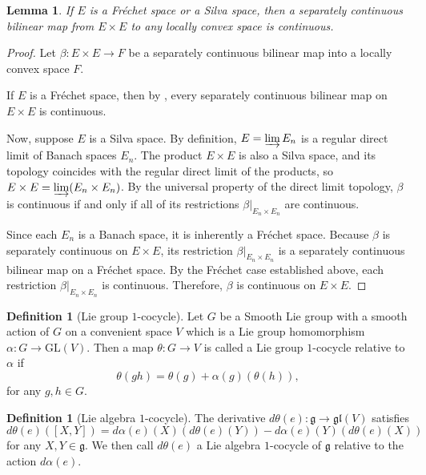 \documentclass[11pt,reqno]{amsart}
\newtheorem{lemma}[theorem]{Lemma}
\theoremstyle{definition}
\newtheorem{definition}[theorem]{Definition}
\numberwithin{equation}{section}
\begin{document}
\begin{lemma}
If $E$ is a Fréchet space or a Silva space, then a separately continuous bilinear map from $E \times E$ to any locally convex space is continuous.
\end{lemma}
\begin{proof}
Let $\beta: E \times E \to F$ be a separately continuous bilinear map into a locally convex space $F$. 

If $E$ is a Fréchet space, then by \cite[5.1]{28}, every separately continuous bilinear map on $E \times E$ is  continuous. 

Now, suppose $E$ is a Silva space. By definition, $E = \varinjlim E_n$ is a regular direct limit of Banach spaces $E_n$. The product $E \times E$ is also a Silva space, and its topology coincides with the regular direct limit of the products, so $E \times E = \varinjlim (E_n \times E_n)$. By the universal property of the direct limit topology, $\beta$ is continuous if and only if all of its restrictions $\beta|_{E_n \times E_n}$ are continuous. 

Since each $E_n$ is a Banach space, it is inherently a Fréchet space. Because $\beta$ is separately continuous on $E \times E$, its restriction $\beta|_{E_n \times E_n}$ is a separately continuous bilinear map on a Fréchet space. By the Fréchet case established above, each restriction $\beta|_{E_n \times E_n}$ is continuous. Therefore, $\beta$ is continuous on $E \times E$.
\end{proof}

\begin{definition}[Lie group $1$-cocycle]\label{Lie group 1-cocycle}
Let $G$ be a Smooth Lie group with a smooth action of $G$ on a convenient space $V$ which is  a Lie group homomorphism $\alpha:G\to \mathrm{GL}(V) $. Then a map $\theta: G\to V$ is called a Lie group $1$-cocycle relative to $\alpha$ if \[ \theta(gh)=\theta(g)+\alpha (g )(\theta(h)), \] for any $g,h\in G$.
\end{definition}
\begin{definition}[Lie algebra $1$-cocycle]\label{Lie algebra 1-cocycle}
The derivative $d\theta (e): \mathfrak g\to \mathfrak{gl}(V)$ satisfies\[
d\theta(e)([X,Y])=d\alpha(e)(X)(d\theta(e)(Y))-d\alpha(e)(Y)(d\theta(e)(X))
\] for any $X, Y\in \mathfrak g$. We then call $d\theta(e)$ a Lie algebra $1$-cocycle of $\mathfrak g$ relative to the action $d\alpha(e)$.
\end{definition}
\end{document}

